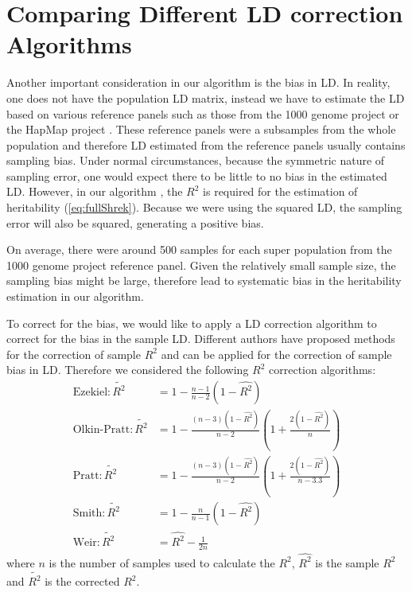 	\section{Comparing Different LD correction Algorithms}
		\label{sec:ldSim}
		Another important consideration in our algorithm is the bias in \gls{LD}.
		In reality, one does not have the population \gls{LD} matrix, instead we have to estimate the \gls{LD} based on various reference panels such as those from the 1000 genome project \citep{Project2012} or the HapMap project \citep{Altshuler2010}.
		These reference panels were a subsamples from the whole population and therefore \gls{LD} estimated from the reference panels usually contains sampling bias.
		Under normal circumstances, because the symmetric nature of sampling error, one would expect there to be little to no bias in the estimated \gls{LD}.
		However, in our algorithm , the $R^2$ is required for the estimation of heritability (\cref{eq:fullShrek}).
		Because we were using the squared \gls{LD}, the sampling error will also be squared, generating a positive bias. 
		
		On average, there were around 500 samples for each super population from the 1000 genome project reference panel.
		Given the relatively small sample size, the sampling bias might be large, therefore lead to systematic bias in the heritability estimation in our algorithm.
		
		To correct for the bias, we would like to apply a \gls{LD} correction algorithm to correct for the bias in the sample \gls{LD}.
		Different authors \citep{Weir1980,Wang2007} have proposed methods for the correction of sample $R^2$ and can be applied for the correction of sample bias in \gls{LD}.
		Therefore we considered the following $R^2$ correction algorithms:
		\begin{align}
		\text{Ezekiel}: \tilde{R^2}&= 1-\frac{n-1}{n-2}(1-\hat{R^2})\label{eq:ezekiel} \\
		\text{Olkin-Pratt}: \tilde{R^2}&=1-\frac{(n-3)(1-\hat{R^2})}{n-2}(1+\frac{2(1-\hat{R^2})}{n})\label{eq:okin} \\
		\text{Pratt}: \tilde{R^2}&=1-\frac{(n-3)(1-\hat{R^2})}{n-2}(1+\frac{2(1-\hat{R^2})}{n-3.3})\label{eq:pratt} \\
		\text{Smith}: \tilde{R^2}&=1-\frac{n}{n-1}(1-\hat{R^2}) \label{eq:smith}\\
		\text{Weir}: \tilde{R^2}&=\hat{R^2}-\frac{1}{2n} \label{eq:weir}
		\end{align}
		where $n$ is the number of samples used to calculate the $R^2$, $\hat{R^2}$ is the sample $R^2$ and $\tilde{R^2}$ is the corrected $R^2$.
		
